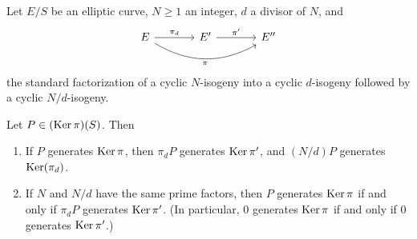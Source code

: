 \begin{backingup}\label{thm:6.7.11}
Let $E/S$ be an elliptic curve, $N \ge 1$ an integer, $d$ a divisor of $N$, and
\[
\begin{tikzcd}[column sep=large, every label/.append style={font=\scriptsize}]
E \arrow[r, "\pi_d"] \arrow[rr, bend right, "\pi"'] & E' \arrow[r, "\pi'"] & E''
\end{tikzcd}
\]
the standard factorization of a cyclic $N$-isogeny into a cyclic $d$-isogeny followed by a cyclic $N/d$-isogeny.

Let $P \in (\operatorname{Ker} \pi)(S)$. Then
\begin{enumerate}[(1)]
\item If $P$ generates $\operatorname{Ker} \pi$, then $\pi_dP$ generates $\operatorname{Ker} \pi'$, and $(N/d)P$ generates $\operatorname{Ker}(\pi_d)$.
\item If $N$ and $N/d$ have the same prime factors, then $P$ generates $\operatorname{Ker} \pi$ if and only if $\pi_dP$ generates $\operatorname{Ker} \pi'$. (In particular, $0$ generates $\operatorname{Ker} \pi$ if and only if $0$ generates $\operatorname{Ker} \pi'$.)
\end{enumerate}
\end{backingup}

